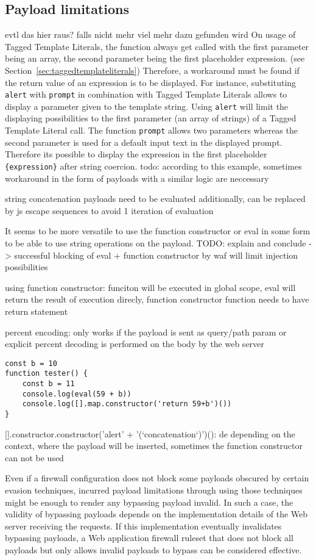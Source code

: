 \subsection{Payload limitations}
\label{sec:payloadlimitations}
{\color{blue} evtl das hier raus? falls nicht mehr viel mehr dazu gefunden wird}
On usage of Tagged Template Literals, the function always get called with the first parameter being an array, the second parameter being the first placeholder expression. (see Section~\ref{sec:taggedtemplateliterals}) Therefore, a workaround must be found if the return value of an expression is to be displayed. For instance, substituting \verb|alert| with \verb|prompt| in combination with Tagged Template Literals allows to display a parameter given to the template string. Using \verb|alert| will limit the displaying possibilities to the first parameter (an array of strings) of a Tagged Template Literal call. The function \verb|prompt| allows two parameters whereas the second parameter is used for a default input text in the displayed prompt. \cite{js/prompt} Therefore its possible to display the expression in the first placeholder {\verb|{expression}|} after string coercion. {\color{red} todo: according to this example, sometimes workaround in the form of payloads with a similar logic are neccessary}

string concatenation payloads need to be evaluated additionally, can be replaced by js escape sequences to avoid 1 iteration of evaluation

It seems to be more versatile to use the function constructor or eval in some form to be able to use string operations on the payload. {\color{red} TODO: explain and conclude -> successful blocking of eval + function constructor by waf will limit injection possibilities}

using function constructor: funciton will be executed in global scope, eval will return the result of execution direcly, function constructor function needs to have return statement

percent encoding: only works if the payload is sent as query/path param or explicit percent decoding is performed on the body by the web server

\begin{lstlisting}
const b = 10
function tester() {
	const b = 11
	console.log(eval(59 + b))
	console.log([].map.constructor('return 59+b')())
}
\end{lstlisting}

{}[].constructor.constructor('alert' + '(`concatenation`)')(): de
depending on the context, where the payload will be inserted, sometimes the function constructor can not be used

Even if a firewall configuration does not block some payloads obscured by certain evasion techniques, incurred payload limitations through using those techniques might be enough to render any bypassing payload invalid. In such a case, the validity of bypassing payloads depends on the implementation details of the Web server receiving the requests. If this implementation eventually invalidates bypassing payloads, a Web application firewall ruleset that does not block all payloads but only allows invalid payloads to bypass can be considered effective.
